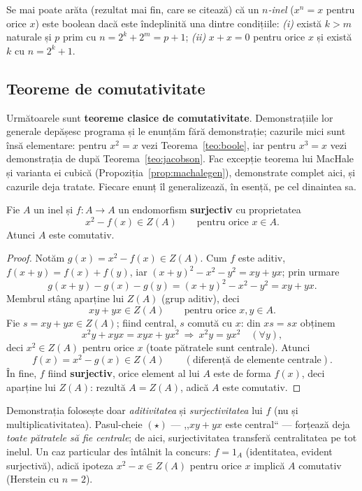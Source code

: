 \begin{observatie}
Se mai poate arăta (rezultat mai fin, care se citează) că un \emph{$n$-inel} ($x^n=x$ pentru orice $x$) este boolean dacă este îndeplinită una dintre condițiile: \emph{(i)} există $k>m$ naturale și $p$ prim cu $n=2^k+2^m=p+1$; \emph{(ii)} $x+x=0$ pentru orice $x$ și există $k$ cu $n=2^k+1$.
\end{observatie}

\subsection*{Teoreme de comutativitate}

Următoarele sunt \textbf{teoreme clasice de comutativitate}. Demonstrațiile lor generale depășesc programa și le enunțăm fără demonstrație; cazurile mici sunt însă elementare: pentru $x^2=x$ vezi Teorema~\ref{teo:boole}, iar pentru $x^3=x$ vezi demonstrația de după Teorema~\ref{teo:jacobson}. Fac excepție teorema lui MacHale și varianta ei cubică (Propoziția~\ref{prop:machalegen}), demonstrate complet aici, și cazurile deja tratate. Fiecare enunț îl generalizează, în esență, pe cel dinaintea sa.

\begin{teorema}[MacHale]\label{teo:machalecomut}
Fie $A$ un inel și $f:A\to A$ un endomorfism \textbf{surjectiv} cu proprietatea
\[
x^2-f(x)\in Z(A)\qquad\text{pentru orice }x\in A.
\]
Atunci $A$ este comutativ.
\end{teorema}

\begin{proof}
Notăm $g(x)=x^2-f(x)\in Z(A)$. Cum $f$ este aditiv, $f(x+y)=f(x)+f(y)$, iar $(x+y)^2-x^2-y^2=xy+yx$; prin urmare
\[
g(x+y)-g(x)-g(y)=(x+y)^2-x^2-y^2=xy+yx.
\]
Membrul stâng aparține lui $Z(A)$ (grup aditiv), deci
\[
xy+yx\in Z(A)\qquad\text{pentru orice }x,y\in A.\tag{$\star$}
\]
Fie $s=xy+yx\in Z(A)$; fiind central, $s$ comută cu $x$: din $xs=sx$ obținem
\[
x^2y+xyx=xyx+yx^2\ \Longrightarrow\ x^2y=yx^2\quad(\forall y),
\]
deci $x^2\in Z(A)$ pentru orice $x$ (toate pătratele sunt centrale). Atunci
\[
f(x)=x^2-g(x)\in Z(A)\qquad(\text{diferență de elemente centrale}).
\]
În fine, $f$ fiind \textbf{surjectiv}, orice element al lui $A$ este de forma $f(x)$, deci aparține lui $Z(A)$: rezultă $A=Z(A)$, adică $A$ este comutativ.
\end{proof}

\begin{observatie}
Demonstrația folosește doar \emph{aditivitatea} și \emph{surjectivitatea} lui $f$ (nu și multiplicativitatea). Pasul-cheie $(\star)$ --- ,,$xy+yx$ este central`` --- forțează deja \emph{toate pătratele să fie centrale}; de aici, surjectivitatea transferă centralitatea pe tot inelul. Un caz particular des întâlnit la concurs: $f=1_A$ (identitatea, evident surjectivă), adică ipoteza $x^2-x\in Z(A)$ pentru orice $x$ implică $A$ comutativ (Herstein cu $n=2$).
\end{observatie}

